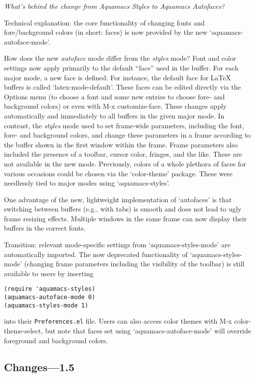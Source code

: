 \emph{What's behind the change from Aquamacs Styles to Aquamacs Autofaces?}
{\small
Technical explanation: the core functionality of changing fonts and fore/background colors (in short: faces) is now provided by the new `aquamacs-autoface-mode'.

How does the new \emph{autoface} mode differ from the \emph{styles} mode?  Font and color settings now apply primarily to the default ``face'' used in the buffer.  For each major mode, a new face is defined.  For instance, the default face for LaTeX buffers is called `latex-mode-default'.  These faces can be edited directly via the Options menu (to choose a font and some new entries to choose fore- and background colors) or even with M-x customize-face.  These changes apply automatically and immediately to all buffers in the given major mode. In contrast, the \emph{styles} mode used to set frame-wide parameters, including the font, fore- and background colors, and change these parameters in a frame according to the buffer shown in the first window within the frame.  Frame parameters also included the presence of a toolbar, cursor color, fringes, and the like.  These are not available in the new mode.
Previously, colors of a whole plethora of faces for various occasions could be chosen via the `color-theme' package.  These were needlessly tied to major modes using `aquamacs-styles'.

One advantage of the new, lightweight implementation of `autofaces' is that switching between buffers (e.g., with tabs) is smooth and does not lead to ugly frame resizing effects.  Multiple windows in the same frame can now display their buffers in the correct fonts.

Transition: relevant mode-specific settings from `aquamacs-styles-mode' are automatically imported.  The now deprecated functionality of `aquamacs-styles-mode' (changing frame parameters including the visibility of the toolbar) is still available to users by inserting
\begin{verbatim}
(require 'aquamacs-styles)
(aquamacs-autoface-mode 0)
(aquamacs-styles-mode 1)
\end{verbatim}
into their {\tt Preferences.el} file.  Users can also access color themes with M-x color-theme-select, but note that faces set using `aquamacs-autoface-mode' will override foreground and background colors.  }


\subsection{Changes---1.5}

